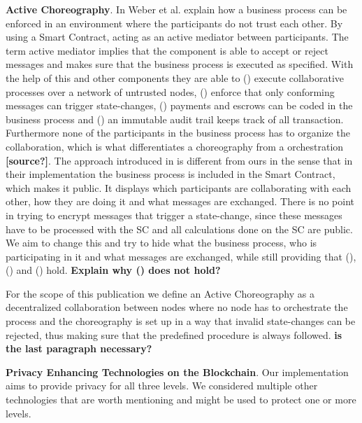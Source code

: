 \documentclass[runningheads]{llncs}
\newcommand{\comment}[1]{}
\newcommand{\rom}[1]{(\uppercase\expandafter{\romannumeral #1\relax})}  %
\begin{document}
\bigbreak
\textbf{Active Choreography}. In \cite{weber2016untrusted} Weber et al. explain how a business process can be enforced in an environment where the participants do not trust each other. By using a Smart Contract, acting as an active mediator between participants. The term active mediator implies that the component is able to accept or reject messages and makes sure that the business process is executed as specified. With the help of this and other components they are able to \rom{1} execute collaborative processes over a network of untrusted nodes, \rom{2} enforce that only conforming messages can trigger state-changes, \rom{3} payments and escrows can be coded in the business process and \rom{4} an immutable audit trail keeps track of all transaction. Furthermore none of the participants in the business process has to organize the collaboration, which is what differentiates a choreography from a orchestration \textbf{[source?]}. The approach introduced in \cite{weber2016untrusted} is different from ours in the sense that in their implementation the business process is included in the Smart Contract, which makes it public. It displays which participants are collaborating with each other, how they are doing it and what messages are exchanged. There is no point in trying to encrypt messages that trigger a state-change, since these messages have to be processed with the SC and all calculations done on the SC are public. We aim to change this and try to hide what the business process, who is participating in it and what messages are exchanged, while still providing that \rom{1}, \rom{2} and \rom{4} hold. \textbf{Explain why \rom{3} does not hold?}

For the scope of this publication we define an Active Choreography as a decentralized collaboration between nodes where no node has to orchestrate the process and the choreography is set up in a way that invalid state-changes can be rejected, thus making sure that the predefined procedure is always followed. \textbf{is the last paragraph necessary?}





\comment{
\begin{itemize}
    \item private blockchain (why is this more private? What kinds are there?)
    \item ring signatures
    \item homomorphic encryption
    \item zero knowledge proofs -> zero cash
    \item partiy.io. Also does secret messages. Has a private contract in the Smart Contract. We are better, because we can hide content from each other (concept of circles). Do a picture with where you are comparing the architecture (siehe mein colledge block)
\end{itemize}
}
\bigbreak
\textbf{Privacy Enhancing Technologies on the Blockchain}. Our implementation aims to provide privacy for all three levels. We considered multiple other technologies that are worth mentioning and might be used to protect one or more levels. 
\end{document}
